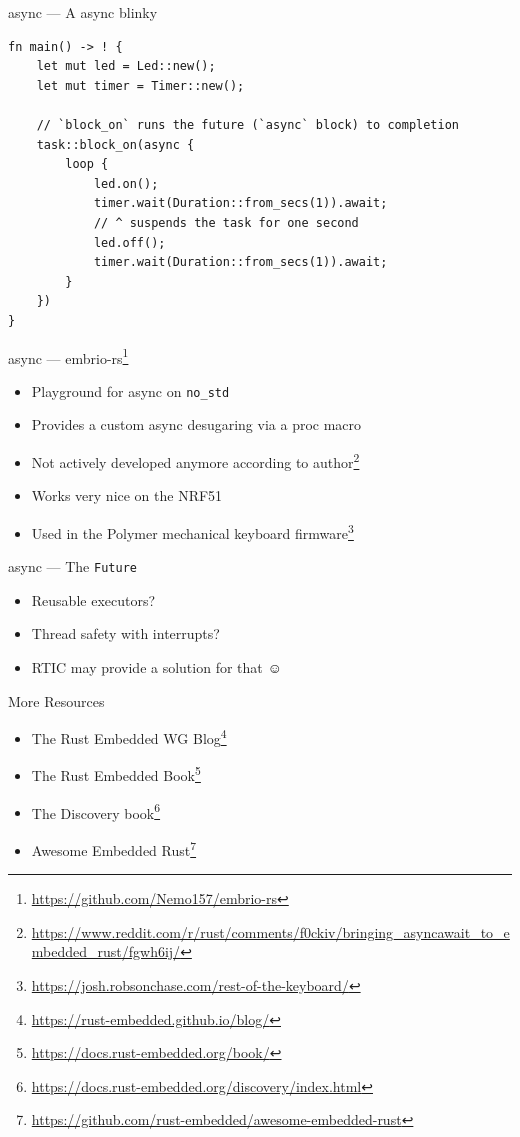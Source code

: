\documentclass[aspectratio=1610,14pt,t]{beamer}
\begin{document}
\begin{frame}[c,fragile]{async --- A async blinky}
  \begin{verbatim}
fn main() -> ! {
    let mut led = Led::new();
    let mut timer = Timer::new();

    // `block_on` runs the future (`async` block) to completion
    task::block_on(async {
        loop {
            led.on();
            timer.wait(Duration::from_secs(1)).await;
            // ^ suspends the task for one second
            led.off();
            timer.wait(Duration::from_secs(1)).await;
        }
    })
}
  \end{verbatim}
\end{frame}



\begin{frame}[c]{async --- embrio-rs\footnote{\url{https://github.com/Nemo157/embrio-rs}}}
  \begin{itemize}
    \item Playground for async on \texttt{no\_std}
    \item Provides a custom async desugaring via a proc macro
    \item Not actively developed anymore according to author\footnote{\url{https://www.reddit.com/r/rust/comments/f0ckiv/bringing_asyncawait_to_embedded_rust/fgwh6ij/}}
    \item Works very nice on the NRF51
    \item Used in the Polymer mechanical keyboard firmware\footnote{\url{https://josh.robsonchase.com/rest-of-the-keyboard/}}
  \end{itemize}
\end{frame}

\begin{frame}[c]{async --- The \texttt{Future}}
  \begin{itemize}
    \item Reusable executors?
    \item Thread safety with interrupts?
    \pause\item RTIC may provide a solution for that {\DejaVu ☺}
  \end{itemize}
\end{frame}

\begin{frame}[c]{More Resources}
  \begin{itemize}
    \item The Rust Embedded WG Blog\footnote{\url{https://rust-embedded.github.io/blog/}}
    \item The Rust Embedded Book\footnote{\url{https://docs.rust-embedded.org/book/}}
    \item The Discovery book\footnote{\url{https://docs.rust-embedded.org/discovery/index.html}}
    \item Awesome Embedded Rust\footnote{\url{https://github.com/rust-embedded/awesome-embedded-rust}}
  \end{itemize}
\end{frame}
\end{document}

